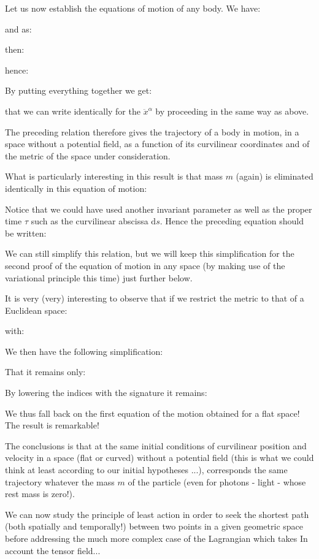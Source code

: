 	Let us now establish the equations of motion of any body. We have:
	
	and as:
	
	then:
	
	hence:
	
	By putting everything together we get:
	
	that we can write identically for the $\ddot{x}^\alpha$ by proceeding in the same way as above.

	The preceding relation therefore gives the trajectory of a body in motion, in a space without a potential field, as a function of its curvilinear coordinates and of the metric of the space under consideration.

	What is particularly interesting in this result is that mass $m$ (again) is eliminated identically in this equation of motion:
	
	Notice that we could have used another invariant parameter as well as the proper time $\tau$ such as the curvilinear abscissa $\mathrm{d}s$. Hence the preceding equation should be written:
	
	We can still simplify this relation, but we will keep this simplification for the second proof of the equation of motion in any space (by making use of the variational principle this time) just further below.

	It is very (very) interesting to observe that if we restrict the metric to that of a Euclidean space:
	
	with:
	
	We then have the following simplification:
	
	That it remains only:
	
	By lowering the indices with the signature it remains:
	
	We thus fall back on the first equation of the motion obtained for a flat space! The result is remarkable!

	The conclusions is that at the same initial conditions of curvilinear position and velocity in a space (flat or curved) without a potential field (this is what we could think at least according to our initial hypotheses ...), corresponds the same trajectory whatever the mass $m$ of the particle (even for photons - light - whose rest mass is zero!).

	We can now study the principle of least action in order to seek the shortest path (both spatially and temporally!) between two points in a given geometric space before addressing the much more complex case of the Lagrangian which takes In account the tensor field...
	
